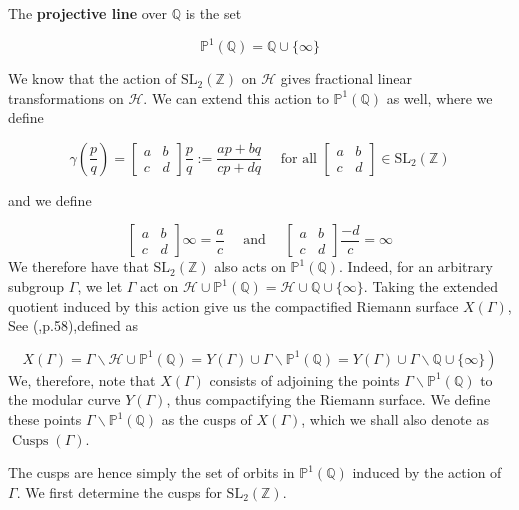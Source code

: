 \begin{definition}
    The \textbf{projective line} over $\mathbb{Q}$ is the set

$$
\mathbb{P}^{1}(\mathbb{Q})=\mathbb{Q} \cup\{\infty\}
$$

\end{definition}
\begin{remark}
We know that the action of $\mathrm{SL}_{2}(\mathbb{Z})$ on $\mathcal{H}$ gives fractional linear transformations on $\mathcal{H}$. We can extend this action to $\mathbb{P}^{1}(\mathbb{Q})$ as well, where we define

$$
\gamma\left(\frac{p}{q}\right)=\left[\begin{array}{ll}
a & b \\
c & d
\end{array}\right] \frac{p}{q}:=\frac{a p+b q}{c p+d q} \quad \text { for all } \left[\begin{array}{ll}
a & b \\
c & d
\end{array}\right] \in \mathrm{SL}_{2}(\mathbb{Z})
$$

and we define

$$
\left[\begin{array}{ll}
a & b \\
c & d
\end{array}\right] \infty=\frac{a}{c} \quad \text { and } \quad\left[\begin{array}{ll}
a & b \\
c & d
\end{array}\right] \frac{-d}{c}=\infty
$$
    We therefore have that $\mathrm{SL}_{2}(\mathbb{Z})$ also acts on $\mathbb{P}^{1}(\mathbb{Q})$. Indeed, for an arbitrary subgroup $\Gamma$, we let $\Gamma$ act on $\mathcal{H} \cup \mathbb{P}^{1}(\mathbb{Q})=\mathcal{H} \cup \mathbb{Q} \cup\{\infty\}$. Taking the extended quotient induced by this action give us the compactified Riemann surface $X(\Gamma)$, See (\cite{diamond2005first},p.58),defined as

$$
\left.X(\Gamma)=\Gamma \backslash \mathcal{H} \cup \mathbb{P}^{1}(\mathbb{Q})=Y(\Gamma) \cup \Gamma \backslash \mathbb{P}^{1}(\mathbb{Q})=Y(\Gamma) \cup \Gamma \backslash \mathbb{Q} \cup\{\infty\}\right)
$$
We, therefore, note that $X(\Gamma)$ consists of adjoining the points $\Gamma \backslash \mathbb{P}^{1}(\mathbb{Q})$ to the modular curve $Y(\Gamma)$, thus compactifying the Riemann surface. We define these points $\Gamma \backslash \mathbb{P}^{1}(\mathbb{Q})$ as the cusps of $X(\Gamma)$, which we shall also denote as $\operatorname{Cusps}(\Gamma)$.

The cusps are hence simply the set of orbits in $\mathbb{P}^{1}(\mathbb{Q})$ induced by the action of $\Gamma$. We first determine the cusps for $\mathrm{SL}_{2}(\mathbb{Z})$.
\end{remark}

